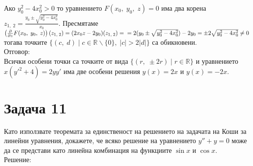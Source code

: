 \documentclass[a4paper, 12pt, oneside]{article}
\newcommand{\R}{\mathbb{R}}
\begin{document}
Ако $y_0^2 - 4x_0^2 > 0$ то уравнението $F(x_0, \; y_0, \; z) = 0$ има два корена \\
$z_{1, \; 2} = \displaystyle\frac{y_0 \pm \sqrt{y_0^2 - 4x_0^2 }}{x_0}$.
Пресмятаме $\left(\frac{\partial}{\partial z} F(x_0, \; y_0, \; z)\right)(z_{1, \; 2}) = (2x_0z - 2y_0)(z_{1, \; 2}) = \\\\
= 2(y_0 \pm \sqrt{y_0^2 - 4x_0^2}) - 2y_0 = \pm2\sqrt{y_0^2 - 4x_0^2} \neq 0$ тогава точките
$\{(c, \; d) \; | \; c \in \R\backslash\{0\}, \; |c| > 2|d|\}$ са обикновени. \\

Отговор: \\

Всички особени точки са точките от вида $\{(r, \; \pm 2r) \; | \; r \in \R\}$
и уравнението $x(y'^2 + 4) = 2yy'$ има две особени решения $y(x) = 2x$ и $y(x) = -2x$.

\section{Задача 11}
Като използвате теоремата за единственост на решението
на задачата на Коши за линейни уравнения, докажете, че
всяко решение на уравнението $y'' + y = 0$ може да се
представи като линейна комбинация на функциите $\sin x$
и $\cos x$. \\

Решение: \\
\end{document}

